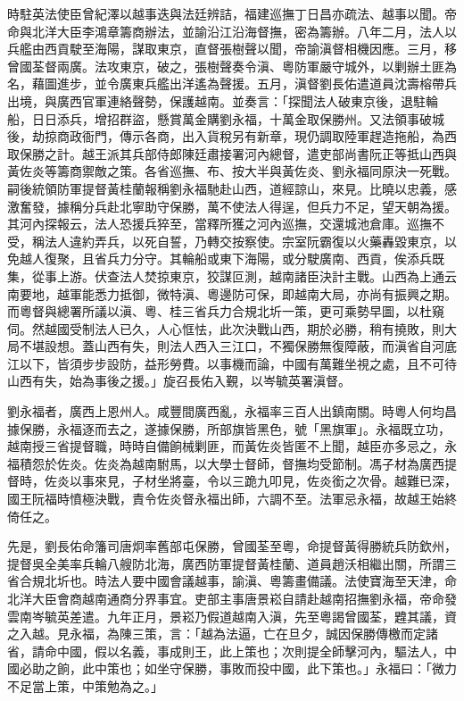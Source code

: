 \begin{pinyinscope}
時駐英法使臣曾紀澤以越事迭與法廷辨詰，福建巡撫丁日昌亦疏法、越事以聞。帝命與北洋大臣李鴻章籌商辦法，並諭沿江沿海督撫，密為籌辦。八年二月，法人以兵艦由西貢駛至海陽，謀取東京，直督張樹聲以聞，帝諭滇督相機因應。三月，移曾國荃督兩廣。法攻東京，破之，張樹聲奏令滇、粵防軍嚴守城外，以剿辦土匪為名，藉圖進步，並令廣東兵艦出洋遙為聲援。五月，滇督劉長佑遣道員沈壽榕帶兵出境，與廣西官軍連絡聲勢，保護越南。並奏言：「探聞法人破東京後，退駐輪船，日日添兵，增招群盜，懸賞萬金購劉永福，十萬金取保勝州。又法領事破城後，劫掠商政衙門，傳示各商，出入貨稅另有新章，現仍調取陸軍趕造拖船，為西取保勝之計。越王派其兵部侍郎陳廷肅接署河內總督，遣吏部尚書阮正等抵山西與黃佐炎等籌商禦敵之策。各省巡撫、布、按大半與黃佐炎、劉永福同原決一死戰。嗣後統領防軍提督黃桂蘭報稱劉永福馳赴山西，道經諒山，來見。比曉以忠義，感激奮發，據稱分兵赴北寧助守保勝，萬不使法人得逞，但兵力不足，望天朝為援。其河內探報云，法人恐援兵猝至，當釋所獲之河內巡撫，交還城池倉庫。巡撫不受，稱法人違約弄兵，以死自誓，乃轉交按察使。宗室阮霸復以火藥轟毀東京，以免越人復聚，且省兵力分守。其輪船或東下海陽，或分駛廣南、西貢，俟添兵既集，從事上游。伏查法人焚掠東京，狡謀叵測，越南諸臣決計主戰。山西為上通云南要地，越軍能悉力抵御，微特滇、粵邊防可保，即越南大局，亦尚有振興之期。而粵督與總署所議以滇、粵、桂三省兵力合規北圻一策，更可乘勢早圖，以杜窺伺。然越國受制法人已久，人心恇怯，此次決戰山西，期於必勝，稍有撓敗，則大局不堪設想。蓋山西有失，則法人西入三江口，不獨保勝無復障蔽，而滇省自河底江以下，皆須步步設防，益形勞費。以事機而論，中國有萬難坐視之處，且不可待山西有失，始為事後之援。」旋召長佑入覲，以岑毓英署滇督。

劉永福者，廣西上恩州人。咸豐間廣西亂，永福率三百人出鎮南關。時粵人何均昌據保勝，永福逐而去之，遂據保勝，所部旗皆黑色，號「黑旗軍」。永福既立功，越南授三省提督職，時時自備餉械剿匪，而黃佐炎皆匿不上聞，越臣亦多忌之，永福積怨於佐炎。佐炎為越南駙馬，以大學士督師，督撫均受節制。馮子材為廣西提督時，佐炎以事來見，子材坐將臺，令以三跪九叩見，佐炎銜之次骨。越難已深，國王阮福時憤極決戰，責令佐炎督永福出師，六調不至。法軍忌永福，故越王始終倚任之。

先是，劉長佑命籓司唐炯率舊部屯保勝，曾國荃至粵，命提督黃得勝統兵防欽州，提督吳全美率兵輪八艘防北海，廣西防軍提督黃桂蘭、道員趙沃相繼出關，所謂三省合規北圻也。時法人要中國會議越事，諭滇、粵籌畫備議。法使寶海至天津，命北洋大臣會商越南通商分界事宜。吏部主事唐景崧自請赴越南招撫劉永福，帝命發雲南岑毓英差遣。九年正月，景崧乃假道越南入滇，先至粵謁曾國荃，韙其議，資之入越。見永福，為陳三策，言：「越為法逼，亡在旦夕，誠因保勝傳檄而定諸省，請命中國，假以名義，事成則王，此上策也；次則提全師擊河內，驅法人，中國必助之餉，此中策也；如坐守保勝，事敗而投中國，此下策也。」永福曰：「微力不足當上策，中策勉為之。」


\end{pinyinscope}

